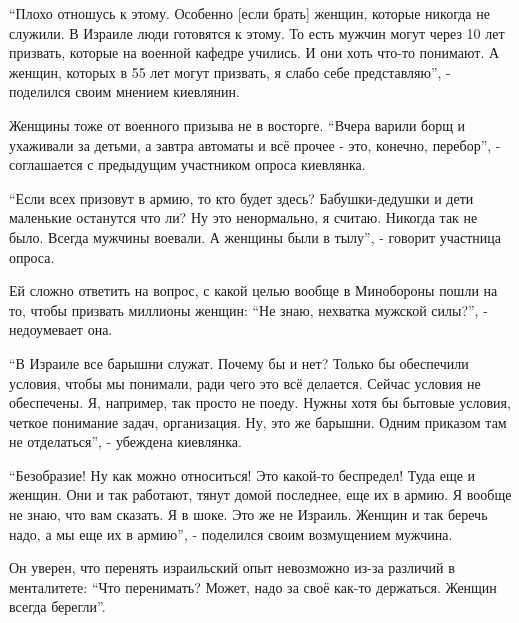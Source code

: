 \begin{multicols}{2} %
\setlength{\parindent}{0pt}


\enquote{Плохо отношусь к этому. Особенно [если брать] женщин, которые никогда не
служили. В Израиле люди готовятся к этому. То есть мужчин могут через 10 лет
призвать, которые на военной кафедре учились. И они хоть что-то понимают. А
женщин, которых в 55 лет могут призвать, я слабо себе представляю}, - поделился
своим мнением киевлянин. 


Женщины тоже от военного призыва не в восторге. \enquote{Вчера варили борщ и ухаживали
за детьми, а завтра автоматы и всё прочее - это, конечно, перебор}, -
соглашается с предыдущим участником опроса киевлянка.


\enquote{Если всех призовут в армию, то кто будет здесь? Бабушки-дедушки и дети
маленькие останутся что ли? Ну это ненормально, я считаю. Никогда так не было.
Всегда мужчины воевали. А женщины были в тылу}, - говорит участница опроса. 

Ей сложно ответить на вопрос, с какой целью вообще в Минобороны пошли на то,
чтобы призвать миллионы женщин: \enquote{Не знаю, нехватка мужской силы?}, -
недоумевает она. 


\enquote{В Израиле все барышни служат. Почему бы и нет? Только бы обеспечили условия,
чтобы мы понимали, ради чего это всё делается. Сейчас условия не обеспечены. Я,
например, так просто не поеду. Нужны хотя бы бытовые условия, четкое понимание
задач, организация. Ну, это же барышни. Одним приказом там не отделаться}, -
убеждена киевлянка.


\enquote{Безобразие! Ну как можно относиться! Это какой-то беспредел! Туда еще и
женщин. Они и так работают, тянут домой последнее, еще их в армию. Я вообще не
знаю, что вам сказать. Я в шоке. Это же не Израиль. Женщин и так беречь надо, а
мы еще их в армию}, - поделился своим возмущением мужчина.

Он уверен, что перенять израильский опыт невозможно из-за различий в
менталитете: \enquote{Что перенимать? Может, надо за своё как-то держаться. Женщин
всегда берегли}.


\end{multicols}
